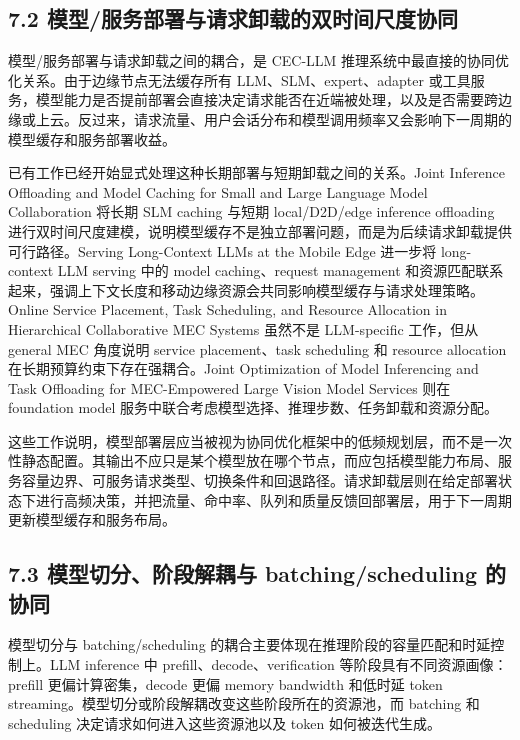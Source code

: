 \documentclass[a4paper,10pt]{ctexart}
\begin{document}
\subsection*{7.2 模型/服务部署与请求卸载的双时间尺度协同}

模型/服务部署与请求卸载之间的耦合，是 CEC-LLM 推理系统中最直接的协同优化关系。由于边缘节点无法缓存所有 LLM、SLM、expert、adapter 或工具服务，模型能力是否提前部署会直接决定请求能否在近端被处理，以及是否需要跨边缘或上云。反过来，请求流量、用户会话分布和模型调用频率又会影响下一周期的模型缓存和服务部署收益。


已有工作已经开始显式处理这种长期部署与短期卸载之间的关系。Joint Inference Offloading and Model Caching for Small and Large Language Model Collaboration 将长期 SLM caching 与短期 local/D2D/edge inference offloading 进行双时间尺度建模，说明模型缓存不是独立部署问题，而是为后续请求卸载提供可行路径。Serving Long-Context LLMs at the Mobile Edge 进一步将 long-context LLM serving 中的 model caching、request management 和资源匹配联系起来，强调上下文长度和移动边缘资源会共同影响模型缓存与请求处理策略。Online Service Placement, Task Scheduling, and Resource Allocation in Hierarchical Collaborative MEC Systems 虽然不是 LLM-specific 工作，但从 general MEC 角度说明 service placement、task scheduling 和 resource allocation 在长期预算约束下存在强耦合。Joint Optimization of Model Inferencing and Task Offloading for MEC-Empowered Large Vision Model Services 则在 foundation model 服务中联合考虑模型选择、推理步数、任务卸载和资源分配。


这些工作说明，模型部署层应当被视为协同优化框架中的低频规划层，而不是一次性静态配置。其输出不应只是某个模型放在哪个节点，而应包括模型能力布局、服务容量边界、可服务请求类型、切换条件和回退路径。请求卸载层则在给定部署状态下进行高频决策，并把流量、命中率、队列和质量反馈回部署层，用于下一周期更新模型缓存和服务布局。


\subsection*{7.3 模型切分、阶段解耦与 batching/scheduling 的协同}

模型切分与 batching/scheduling 的耦合主要体现在推理阶段的容量匹配和时延控制上。LLM inference 中 prefill、decode、verification 等阶段具有不同资源画像：prefill 更偏计算密集，decode 更偏 memory bandwidth 和低时延 token streaming。模型切分或阶段解耦改变这些阶段所在的资源池，而 batching 和 scheduling 决定请求如何进入这些资源池以及 token 如何被迭代生成。
\end{document}
